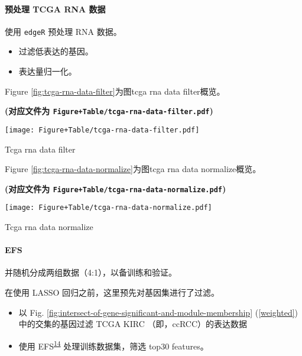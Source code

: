 \documentclass[
]{article}
\providecommand{\tightlist}{%
  \setlength{\itemsep}{0pt}\setlength{\parskip}{0pt}}
\begin{document}
\hypertarget{ux9884ux5904ux7406-tcga-rna-ux6570ux636e}{%
\paragraph{预处理 TCGA RNA 数据}\label{ux9884ux5904ux7406-tcga-rna-ux6570ux636e}}

使用 \texttt{edgeR} 预处理 RNA 数据。

\begin{itemize}
\tightlist
\item
  过滤低表达的基因。
\item
  表达量归一化。
\end{itemize}

Figure \ref{fig:tcga-rna-data-filter}为图tcga rna data filter概览。

\textbf{(对应文件为 \texttt{Figure+Table/tcga-rna-data-filter.pdf})}

\def\@captype{figure}
\begin{center}
\texttt{[image: Figure+Table/tcga-rna-data-filter.pdf]}
\caption{Tcga rna data filter}\label{fig:tcga-rna-data-filter}
\end{center}

Figure \ref{fig:tcga-rna-data-normalize}为图tcga rna data normalize概览。

\textbf{(对应文件为 \texttt{Figure+Table/tcga-rna-data-normalize.pdf})}

\def\@captype{figure}
\begin{center}
\texttt{[image: Figure+Table/tcga-rna-data-normalize.pdf]}
\caption{Tcga rna data normalize}\label{fig:tcga-rna-data-normalize}
\end{center}

\hypertarget{efs}{%
\paragraph{EFS}\label{efs}}

并随机分成两组数据（4:1），以备训练和验证。

在使用 LASSO 回归之前，这里预先对基因集进行了过滤。

\begin{itemize}
\tightlist
\item
  以 Fig. \ref{fig:intersect-of-gene-significant-and-module-membership} (\ref{weighted}) 中的交集的基因过滤 TCGA KIRC （即，ccRCC）的表达数据
\item
  使用 EFS\textsuperscript{\protect\hyperlink{ref-EfsAnEnsemblNeuman2017}{14}} 处理训练数据集，筛选 top30 features。
\end{itemize}
\end{document}
